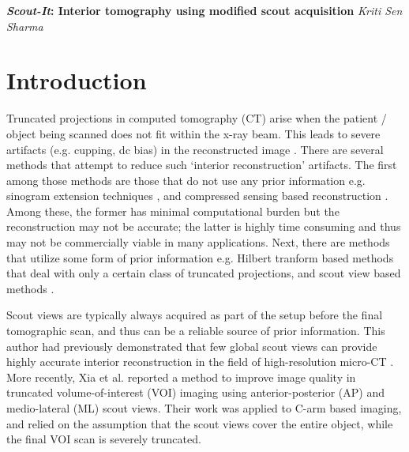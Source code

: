 \documentclass[]{spie}
\begin{document}
{\center \LARGE \textbf{\textit{Scout-It}:   Interior tomography using modified scout acquisition}}
\linebreak
\linebreak
\vspace{1.5 cm} 
{\Large \textit{Kriti Sen Sharma} }

\tableofcontents
\setcounter{tocdepth}{0}



\section{Introduction}
\label{sec:introduction}

Truncated projections in computed tomography (CT) arise when the patient / object being scanned does not fit within the x-ray beam. This leads to severe artifacts (e.g. cupping, dc bias) in the reconstructed image 	\cite{Natterer2001}. There are several methods that attempt to reduce such `interior reconstruction' artifacts. The first among those methods are those that do not use any prior information e.g. sinogram extension techniques \cite{Kolditz2011,VanGompel2009}, and compressed sensing based reconstruction \cite{Yu2009}. Among these, the former has minimal computational burden but the reconstruction may not be accurate; the latter is highly time consuming and thus may not be commercially viable in many applications. Next, there are  methods that utilize some form of prior information e.g. Hilbert tranform based methods \cite{Noo2004,Defrise2006} that deal with only a certain class of truncated projections, and scout view based methods \cite{SenSharma2013,Xia2015}. 

Scout views are typically always acquired as part of the setup before the final tomographic scan, and thus can be a reliable source of prior information. This author had previously demonstrated that few global scout views can provide highly accurate interior reconstruction in the field of high-resolution micro-CT \cite{SenSharma2013}. More recently, Xia et al. \cite{Xia2015} reported a method to improve image quality in truncated volume-of-interest (VOI) imaging using anterior-posterior (AP) and medio-lateral (ML) scout views. Their work was applied to C-arm based imaging, and relied on the assumption that the scout views cover the entire object, while the final VOI scan is severely truncated. 
\end{document}
